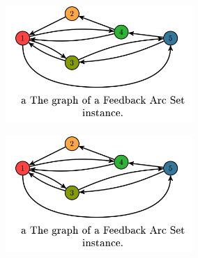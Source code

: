 \documentclass[seminar,german]{algothesis}
\begin{document}
\begin{figure}[ht]
	\centering
	\begin{subfigure}{.4\textwidth}
		\includegraphics[width=0.78\textwidth]{graph}
    \end{subfigure}%
    \begin{subfigure}{.4\textwidth}
		\includegraphics[width=0.78\textwidth]{graph}
    \end{subfigure}
\end{figure}
\end{document}
